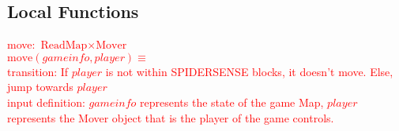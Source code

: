 \documentclass[12pt]{article}
\newcommand{\Implies}{\Rightarrow}
\newcommand{\m}[1]{\mbox{#1}}
\begin{document}


\subsection*{Local Functions}

\noindent\textcolor{red}{ move: $\m{ReadMap} \times \m{Mover}$\\
$\m{move}(gameinfo, player) \equiv$\\
transition: If $player$ is not within SPIDERSENSE blocks, it doesn't move. Else, jump towards $player$\\
input definition: $gameinfo$ represents the state of the game Map, $player$ represents the Mover object that is the player of the game controls.
}
\end{document}
